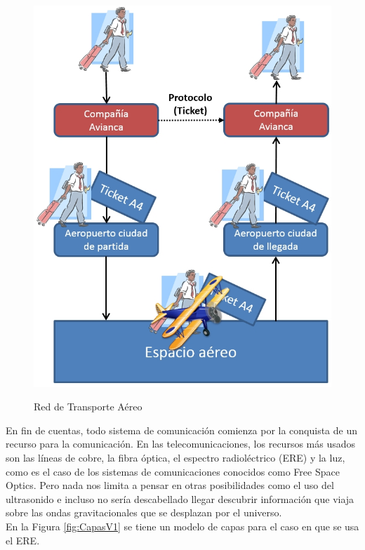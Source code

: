 \begin{figure}[h!]
	\captionsetup{justification = raggedright, singlelinecheck = false}
	\caption{Red de Transporte Aéreo} 
	\centering
	\includegraphics[scale=0.4]{Imagenes/modelo_aviacion_red}
	\label{fig:modelo_aviacion_red}
\end{figure}

En fin de cuentas, todo sistema de comunicación comienza por la conquista de un recurso para la comunicación. En las telecomunicaciones, los recursos más usados son las líneas de cobre, la fibra óptica, el espectro radioléctrico (ERE) y la luz, como es el caso de los sistemas de comunicaciones conocidos como Free Space Optics. Pero nada nos limita a pensar en otras posibilidades como el uso del ultrasonido e incluso no sería descabellado llegar descubrir información que viaja sobre las ondas gravitacionales que se desplazan por el universo.\\

En la Figura \ref{fig:CapasV1} se tiene un modelo de capas para el caso en que se usa el ERE. \\

